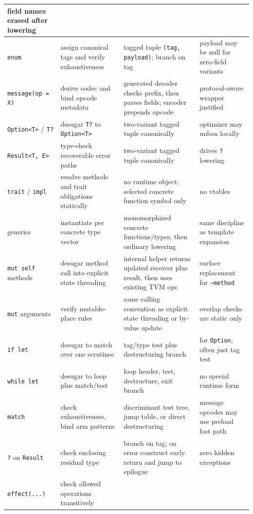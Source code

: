\documentclass[12pt,oneside]{article}
\begin{document}
\begin{longtable}{|L{0.15\textwidth}|L{0.24\textwidth}|L{0.24\textwidth}|L{0.15\textwidth}|}
field names erased after lowering \\ \hline
\texttt{enum} &
assign canonical tags and verify exhaustiveness &
tagged tuple \texttt{(tag, payload)}; branch on tag &
payload may be null for zero-field variants \\ \hline
\texttt{message(op = X)} &
derive codec and bind opcode metadata &
generated decoder checks prefix, then parses fields; encoder prepends opcode &
protocol-aware wrapper justified \\ \hline
\texttt{Option<T>} / \texttt{T?} &
desugar \texttt{T?} to \texttt{Option<T>} &
two-variant tagged tuple canonically &
optimizer may unbox locally \\ \hline
\texttt{Result<T, E>} &
type-check recoverable error paths &
two-variant tagged tuple canonically &
drives \texttt{?} lowering \\ \hline
\texttt{trait} / \texttt{impl} &
resolve methods and trait obligations statically &
no runtime object; selected concrete function symbol only &
no vtables \\ \hline
generics &
instantiate per concrete type vector &
monomorphized concrete functions/types, then ordinary lowering &
same discipline as template expansion \\ \hline
\texttt{mut self} methods &
desugar method call into explicit state threading &
internal helper returns updated receiver plus result, then uses existing TVM ops &
surface replacement for \texttt{\~{}method} \\ \hline
\texttt{mut} arguments &
verify mutable-place rules &
same calling convention as explicit state threading or by-value update &
overlap checks are static only \\ \hline
\texttt{if let} &
desugar to match over one scrutinee &
tag/type test plus destructuring branch &
for \texttt{Option}, often just tag test \\ \hline
\texttt{while let} &
desugar to loop plus match/test &
loop header, test, destructure, exit branch &
no special runtime form \\ \hline
\texttt{match} &
check exhaustiveness, bind arm patterns &
discriminant test tree, jump table, or direct destructuring &
message opcodes may use preload fast path \\ \hline
\texttt{?} on \texttt{Result} &
check enclosing residual type &
branch on tag; on error construct early return and jump to epilogue &
zero hidden exceptions \\ \hline
\texttt{effect(...)} &
check allowed operations transitively &

\end{longtable}
\end{document}
